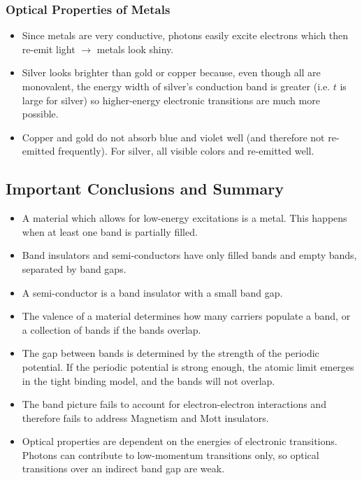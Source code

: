 \documentclass[10pt]{article}
\begin{document}
\subsubsection{Optical Properties of Metals}
\begin{itemize}
  \item Since metals are very conductive, photons easily excite electrons which then re-emit light $\rightarrow$ metals look shiny.
  \item Silver looks brighter than gold or copper because, even though all are monovalent, the energy width of silver's conduction
  band is greater (i.e. $t$ is large for silver) so higher-energy electronic transitions are much more possible.
  \item Copper and gold do not absorb blue and violet well (and therefore not re-emitted frequently). For silver, all visible colors and re-emitted well.
\end{itemize}

\subsection{Important Conclusions and Summary}
\begin{itemize}
  \item A material which allows for low-energy excitations is a metal. This happens when at least one band is partially filled.
  \item Band insulators and semi-conductors have only filled bands and empty bands, separated by band gaps.
  \item A semi-conductor is a band insulator with a small band gap.
  \item The valence of a material determines how many carriers populate a band, or a collection of bands if the bands overlap.
  \item The gap between bands is determined by the strength of the periodic potential. If the periodic potential is strong enough, the
  atomic limit emerges in the tight binding model, and the bands will not overlap.
  \item The band picture fails to account for electron-electron interactions and therefore fails to address Magnetism and Mott insulators.
  \item Optical properties are dependent on the energies of electronic transitions. Photons can contribute to low-momentum transitions only, so
  optical transitions over an indirect band gap are weak.
\end{itemize}
\end{document}
